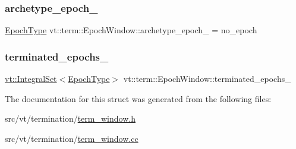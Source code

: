 \subsubsection{\texorpdfstring{archetype\+\_\+epoch\+\_\+}{archetype\_epoch\_}}
{\footnotesize\ttfamily \hyperlink{namespacevt_a985a5adf291c34a3ca263b3378388236}{Epoch\+Type} vt\+::term\+::\+Epoch\+Window\+::archetype\+\_\+epoch\+\_\+ = no\+\_\+epoch\hspace{0.3cm}{\ttfamily [private]}}

\mbox{\label{structvt_1_1term_1_1_epoch_window_a08cdffaeea9d883542529b221b6c8fc9}} 
\subsubsection{\texorpdfstring{terminated\+\_\+epochs\+\_\+}{terminated\_epochs\_}}
{\footnotesize\ttfamily \hyperlink{namespacevt_af8fc7210a3d8e598330cf3375857ef1e}{vt\+::\+Integral\+Set}$<$\hyperlink{namespacevt_a985a5adf291c34a3ca263b3378388236}{Epoch\+Type}$>$ vt\+::term\+::\+Epoch\+Window\+::terminated\+\_\+epochs\+\_\+\hspace{0.3cm}{\ttfamily [private]}}



The documentation for this struct was generated from the following files\+:\begin{DoxyCompactItemize}
\item 
src/vt/termination/\hyperlink{term__window_8h}{term\+\_\+window.\+h}\item 
src/vt/termination/\hyperlink{term__window_8cc}{term\+\_\+window.\+cc}\end{DoxyCompactItemize}
